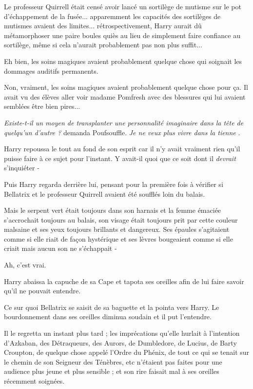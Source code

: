 Le professeur Quirrell était censé avoir lancé un sortilège de mutisme sur le pot d'échappement de la fusée... apparemment les capacités des sortilèges de mutismes avaient des limites... rétrospectivement, Harry aurait dû métamorphoser une paire boules quiès au lieu de simplement faire confiance au sortilège, même si cela n'aurait probablement pas non plus suffit...

Eh bien, les soins magiques avaient probablement quelque chose qui soignait les dommages auditifs permanents.

Non, vraiment, les soins magiques avaient probablement quelque chose pour ça. Il avait vu des élèves aller voir madame Pomfresh avec des blessures qui lui avaient semblées être bien pires...

\emph{Existe-t-il un moyen de transplanter une personnalité imaginaire dans la tête de quelqu'un d'autre ?}  demanda Poufsouffle. \emph{Je ne veux plus vivre dans la tienne} .

Harry repoussa le tout au fond de son esprit car il n'y avait vraiment rien qu'il puisse faire à ce sujet pour l'instant. Y avait-il quoi que ce soit dont il \emph{devrait}  s'inquiéter -

Puis Harry regarda derrière lui, pensant pour la première fois à vérifier si Bellatrix et le professeur Quirrell avaient été soufflés loin du balais.

Mais le serpent vert était toujours dans son harnais et la femme émaciée s'accrochait toujours au balais, son visage était toujours prit par cette couleur malsaine et ses yeux toujours brillants et dangereux. Ses épaules s'agitaient comme si elle riait de façon hystérique et ses lèvres bougeaient comme si elle criait mais aucun son ne s'échappait -

Ah, c'est vrai.

Harry abaissa la capuche de sa Cape et tapota ses oreilles afin de lui faire savoir qu'il ne pouvait entendre.

Ce sur quoi Bellatrix se saisit de sa baguette et la pointa vers Harry. Le bourdonnement dans ses oreilles diminua soudain et il put l'entendre.

Il le regretta un instant plus tard ; les imprécations qu'elle hurlait à l'intention d'Azkaban, des Détraqueurs, des Aurors, de Dumbledore, de Lucius, de Barty Croupton, de quelque chose appelé l'Ordre du Phénix, de tout ce qui se tenait sur le chemin de son Seigneur des Ténèbres, etc n'étaient pas faites pour une audience plus jeune et plus sensible ; et son rire faisait mal à ses oreilles récemment soignées.

